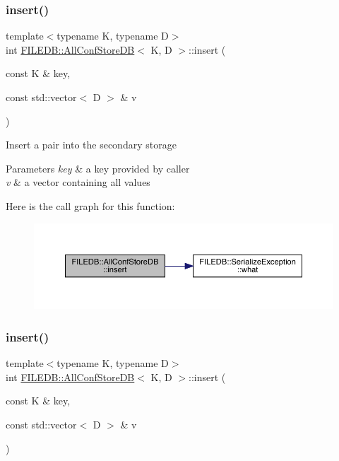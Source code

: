 \subsubsection{\texorpdfstring{insert()}{insert()}\hspace{0.1cm}{\footnotesize\ttfamily [2/3]}}
{\footnotesize\ttfamily template$<$typename K, typename D$>$ \\
int \mbox{\hyperlink{classFILEDB_1_1AllConfStoreDB}{F\+I\+L\+E\+D\+B\+::\+All\+Conf\+Store\+DB}}$<$ K, D $>$\+::insert (\begin{DoxyParamCaption}\item[{const K \&}]{key,  }\item[{const std\+::vector$<$ D $>$ \&}]{v }\end{DoxyParamCaption})\hspace{0.3cm}{\ttfamily [inline]}}

Insert a pair into the secondary storage 
\begin{DoxyParams}{Parameters}
{\em key} & a key provided by caller \\
\hline
{\em v} & a vector containing all values \\
\hline
\end{DoxyParams}
Here is the call graph for this function\+:
\nopagebreak
\begin{figure}[H]
\begin{center}
\leavevmode
\includegraphics[width=350pt]{df/db6/classFILEDB_1_1AllConfStoreDB_abf4a1ccd7306de436ba1ec61b242e02f_cgraph}
\end{center}
\end{figure}
\mbox{\label{classFILEDB_1_1AllConfStoreDB_abf4a1ccd7306de436ba1ec61b242e02f}} 
\subsubsection{\texorpdfstring{insert()}{insert()}\hspace{0.1cm}{\footnotesize\ttfamily [3/3]}}
{\footnotesize\ttfamily template$<$typename K, typename D$>$ \\
int \mbox{\hyperlink{classFILEDB_1_1AllConfStoreDB}{F\+I\+L\+E\+D\+B\+::\+All\+Conf\+Store\+DB}}$<$ K, D $>$\+::insert (\begin{DoxyParamCaption}\item[{const K \&}]{key,  }\item[{const std\+::vector$<$ D $>$ \&}]{v }\end{DoxyParamCaption})\hspace{0.3cm}{\ttfamily [inline]}}

